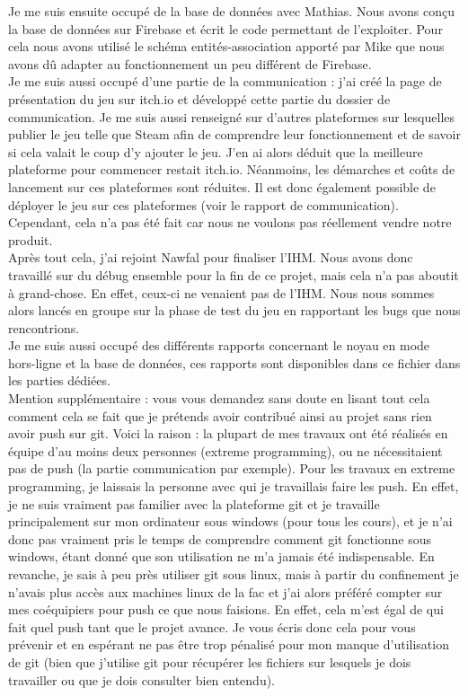 \documentclass[a4paper,11pt]{article}
\begin{document}
\newpage

    Je me suis ensuite occupé de la base de données avec Mathias. Nous avons conçu la base de données sur Firebase et écrit le code permettant de l’exploiter. Pour cela nous avons utilisé le schéma entités-association apporté par Mike que nous avons dû adapter au fonctionnement un peu différent de Firebase. \\

    Je me suis aussi occupé d’une partie de la communication : j’ai créé la page de présentation du jeu sur itch.io et développé cette partie du dossier de communication. Je me suis aussi renseigné sur d’autres plateformes sur lesquelles publier le jeu telle que Steam afin de comprendre leur fonctionnement et de savoir si cela valait le coup d’y ajouter le jeu. J’en ai alors déduit que la meilleure plateforme pour commencer restait itch.io. Néanmoins, les démarches et coûts de lancement sur ces plateformes sont réduites. Il est donc également possible de déployer le jeu sur ces plateformes (voir le rapport de communication). Cependant, cela n'a pas été fait car nous ne voulons pas réellement vendre notre produit. \\

    Après tout cela, j’ai rejoint Nawfal pour finaliser l’IHM. Nous avons donc travaillé sur du débug ensemble pour la fin de ce projet, mais cela n’a pas aboutit à grand-chose. En effet, ceux-ci ne venaient pas de l’IHM. Nous nous sommes alors lancés en groupe sur la phase de test du jeu en rapportant les bugs que nous rencontrions. \\

    Je me suis aussi occupé des différents rapports concernant le noyau en mode hors-ligne et la base de données, ces rapports sont disponibles dans ce fichier dans les parties dédiées. \\

    Mention supplémentaire : vous vous demandez sans doute en lisant tout cela comment cela se fait que je prétends avoir contribué ainsi au projet sans rien avoir push sur git. Voici la raison : la plupart de mes travaux ont été réalisés en équipe d’au moins deux personnes (extreme programming), ou ne nécessitaient pas de push (la partie communication par exemple). Pour les travaux en extreme programming, je laissais la personne avec qui je travaillais faire les push. En effet, je ne suis vraiment pas familier avec la plateforme git et je travaille principalement sur mon ordinateur sous windows (pour tous les cours), et je n’ai donc pas vraiment pris le temps de comprendre comment git fonctionne sous windows, étant donné que son utilisation ne m’a jamais été indispensable. En revanche, je sais à peu près utiliser git sous linux, mais à partir du confinement je n’avais plus accès aux machines linux de la fac et j’ai alors préféré compter sur mes coéquipiers pour push ce que nous faisions. En effet, cela m’est égal de qui fait quel push tant que le projet avance. Je vous écris donc cela pour vous prévenir et en espérant ne pas être trop pénalisé pour mon manque d’utilisation de git (bien que j’utilise git pour récupérer les fichiers sur lesquels je dois travailler ou que je dois consulter bien entendu). \\
\end{document}

